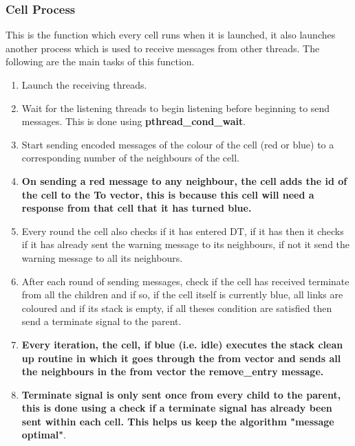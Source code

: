 \documentclass[a4paper,12pt]{report}
\begin{document}
\subsubsection{Cell Process}
This is the function which every cell runs when it is launched, it also launches another process which is used to receive messages from other threads. The following are the main tasks of this function.
\begin{enumerate}
\item Launch the receiving threads.
\item Wait for the listening threads to begin listening before beginning to send messages. This is done using \textbf{pthread\_cond\_wait}.
\item Start sending encoded messages of the colour of the cell (red or blue) to a corresponding number of the neighbours of the cell.
\item\textbf{On sending a red message to any neighbour, the cell adds the id of the cell to the To vector, this is because this cell will need a response from that cell that it has turned blue.}
\item Every round the cell also checks if it has entered DT, if it has then it checks if it has already sent the warning message to its neighbours, if not it send the warning message to all its neighbours.
\item After each round of sending messages, check if the cell has received terminate from all the children and if so, if the cell itself is currently blue, all links are coloured and if its stack is empty, if all theses condition are satisfied then send a terminate signal to the parent.
\item \textbf{Every iteration, the cell, if blue (i.e. idle) executes the stack clean up routine in which it goes through the from vector and sends all the neighbours in the from vector the remove\_entry message.}
\item \textbf{Terminate signal is only sent once from every child to the parent, this is done using a check if a terminate signal has already been sent within each cell. This helps us keep the algorithm "message optimal"}.
\end{enumerate}
\end{document}
